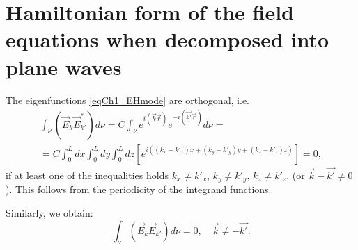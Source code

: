 \section{Hamiltonian form of the field equations when decomposed into plane waves}
The eigenfunctions \eqref{eqCh1_EHmode} are orthogonal, i.e.
\begin{eqnarray}
\int_{\nu} \left( \vec{E}_k \vec{E}_{k'}^{*} \right) d \nu =
C \int_{\nu} e^{i \left(\vec{k}\vec{r}\right)} e^{- i
  \left(\vec{k'}\vec{r}\right)} d \nu =
\nonumber \\
= C \int_0^L d x \int_0^L d y \int_0^L d z
\left[ e^{i\left(
\left(k_x - k'_x\right) x +
\left(k_y - k'_y\right) y +
\left(k_z - k'_z\right) z
\right)}
\right] = 0,
\end{eqnarray}
if at least one of the inequalities holds 
$k_x \ne k'_x$,
$k_y \ne k'_y$,
$k_z \ne k'_z$,
(or 
$\vec{k} - \vec{k'} \ne 0$
).  This follows from the periodicity of the integrand functions. 

Similarly, we obtain:
\begin{equation}
\int_{\nu} \left( \vec{E}_k \vec{E}_{k'} \right) d \nu = 0,
\quad
\vec{k} \ne - \vec{k'}.
\end{equation}

